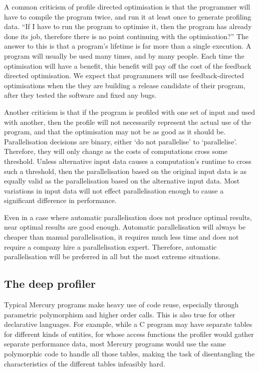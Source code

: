 
A common criticism of profile directed optimisation is that the programmer will
have to compile the program twice,
and run it at least once to generate profiling data.
``If I have to run the program to optimise it, then the program has
already done its job,
therefore there is no point continuing with the optimisation?''
The answer to this is that a program's lifetime is far more than a
single execution.
A program will usually be used many times, and by many people.
Each time the optimisation will have a benefit,
this benefit will pay off the cost of the feedback directed optimisation.
We expect that programmers will use feedback-directed optimisations when the
they are building a release candidate of their program,
after they tested the software and fixed any bugs.

Another criticism is that if the program is profiled with one set of input and
used with another,
then the profile will not necessarily represent the actual use
of the program,
and that the optimisation may not be as good as it should be.
Parallelisation decisions are binary,
either `do not parallelise' to `parallelise'.
Therefore,
they will only change as the costs of computations cross some threshold.
Unless alternative input data causes a computation's runtime to cross such a
threshold,
then the parallelisation based on the original input data is 
as equally valid as the parallelisation based on the alternative input data.
Most variations in input data will not  
effect parallelisation enough to cause a significant difference in performance.

Even in a case where automatic parallelisation does not produce optimal
results,
near optimal results are good enough.
Automatic parallelisation will always be cheaper than manual
parallelisation,
it requires much less time and does not require a company hire a
parallelisation expert.
Therefore, automatic parallelisation will be preferred in all but the most
extreme situations.

\subsection{The deep profiler}
\label{sec:backgnd_deep}

Typical Mercury programs make heavy use of code reuse,
especially through parametric polymorphism and higher order calls.
This is also true for other declarative languages.
For example, while a C program may have
separate tables for different kinds of entities,
for whose access functions
the profiler would gather separate performance data,
most Mercury programs would use
the same polymorphic code to handle all those tables,
making the task of disentangling the characteristics of the different tables
infeasibly hard.

